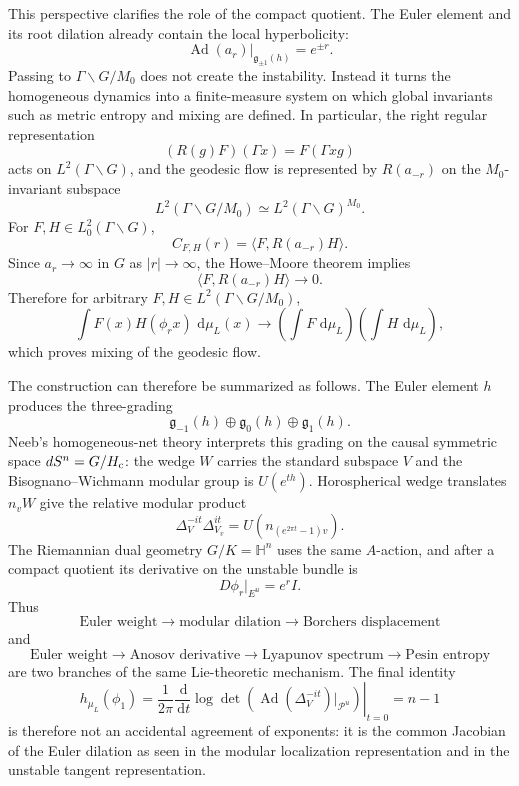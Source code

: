 \documentclass[11pt]{article}
\theoremstyle{definition}
\newcommand{\dd}{\,\mathrm{d}}
\newcommand{\Ad}{\operatorname{Ad}}
\begin{document}
This perspective clarifies the role of the compact quotient.  The Euler element and its
root dilation already contain the local hyperbolicity:
\[
\Ad(a_r)|_{\mathfrak g_{\pm1}(h)}=e^{\pm r}.
\]
Passing to \(\Gamma\backslash G/M_0\) does not create the instability.  Instead it turns
the homogeneous dynamics into a finite-measure system on which global invariants such as
metric entropy and mixing are defined.  In particular, the right regular representation
\[
(R(g)F)(\Gamma x)=F(\Gamma xg)
\]
acts on \(L^2(\Gamma\backslash G)\), and the geodesic flow is represented by
\(R(a_{-r})\) on the \(M_0\)-invariant subspace
\[
L^2(\Gamma\backslash G/M_0)
\simeq
L^2(\Gamma\backslash G)^{M_0}.
\]
For \(F,H\in L^2_0(\Gamma\backslash G)\),
\[
C_{F,H}(r)
=
\langle F,R(a_{-r})H\rangle.
\]
Since \(a_r\to\infty\) in \(G\) as \(|r|\to\infty\), the Howe--Moore theorem implies
\begin{equation}
\langle F,R(a_{-r})H\rangle\longrightarrow0.
\label{eq:howe-moore}
\end{equation}
Therefore for arbitrary \(F,H\in L^2(\Gamma\backslash G/M_0)\),
\begin{equation}
\int F(x)H(\phi_rx)\,\dd\mu_L(x)
\longrightarrow
\left(\int F\,\dd\mu_L\right)
\left(\int H\,\dd\mu_L\right),
\label{eq:mixing}
\end{equation}
which proves mixing of the geodesic flow.

The construction can therefore be summarized as follows.  The Euler element \(h\)
produces the three-grading
\[
\mathfrak g_{-1}(h)\oplus\mathfrak g_0(h)\oplus\mathfrak g_1(h).
\]
Neeb's homogeneous-net theory interprets this grading on the causal symmetric space
\(dS^n=G/H_{\rm c}\): the wedge \(W\) carries the standard subspace \(V\) and the
Bisognano--Wichmann modular group is \(U(e^{th})\).  Horospherical wedge translates
\(n_vW\) give the relative modular product
\[
\Delta_V^{-it}\Delta_{V_v}^{it}
=
U(n_{(e^{2\pi t}-1)v}).
\]
The Riemannian dual geometry \(G/K=\mathbb H^n\) uses the same \(A\)-action, and after a
compact quotient its derivative on the unstable bundle is
\[
D\phi_r|_{E^u}
=
e^rI.
\]
Thus
\[
\text{Euler weight}
\longrightarrow
\text{modular dilation}
\longrightarrow
\text{Borchers displacement}
\]
and
\[
\text{Euler weight}
\longrightarrow
\text{Anosov derivative}
\longrightarrow
\text{Lyapunov spectrum}
\longrightarrow
\text{Pesin entropy}
\]
are two branches of the same Lie-theoretic mechanism.  The final identity
\[
h_{\mu_L}(\phi_1)
=
\frac{1}{2\pi}
\left.
\frac{\dd}{\dd t}
\log
\det\left(
\Ad(\Delta_V^{-it})|_{\mathcal P^u}
\right)
\right|_{t=0}
=
n-1
\]
is therefore not an accidental agreement of exponents: it is the common Jacobian of the
Euler dilation as seen in the modular localization representation and in the unstable
tangent representation.
\end{document}
